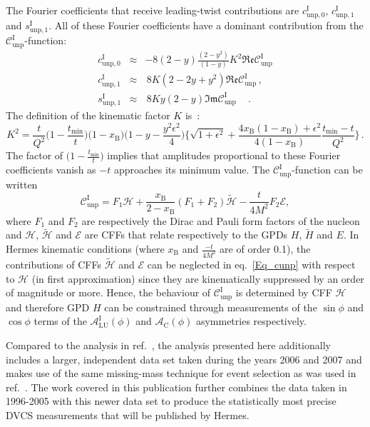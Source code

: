 The Fourier coefficients that receive leading-twist contributions are $c_{\textrm{unp},0}^{\textrm{I}}$, $c_{\textrm{unp},1}^{\textrm{I}}$ and $s_{\textrm{unp},1}^{\textrm{I}}$. All of these Fourier coefficients have a dominant contribution from the $\mathcal{C}_{\textrm{unp}}^{\textrm{I}}$-function:
\begin{eqnarray}
c_{\textrm{unp},0}^{\textrm{I}} &\approx&-8(2-y)\frac{(2-y^2)}{(1-y)}K^2\mathfrak{Re}\mathcal{C}_{\textrm{unp}}^{\textrm{I}}\label{eq:c0}
\\
c_{\textrm{unp},1}^{\textrm{I}} &\approx&\,8K(2- 2y + y^{2})\mathfrak{Re}\mathcal{C}_{\textrm{unp}}^{\textrm{I}}\,,\label{eq:c1}
\\
s_{\textrm{unp},1}^{\textrm{I}} &\approx&\,8Ky(2-y)\mathfrak{Im}\mathcal{C}_{\textrm{unp}}^{\textrm{I}}\quad\,. \label{eq:s1}
\end{eqnarray}
The definition of the kinematic factor $K$ is~\cite{Bel02b}:
\begin{equation}
K^2=\frac{t}{Q^2}\Big(1-\frac{t_{\textrm{min}}}{t}\Big)\Big(1-x_{\textrm{B}}\Big)\Big(1-y-\frac{y^2\epsilon^2}{4}\Big)\Big\lbrace\sqrt{1+\epsilon^2}+\frac{4x_{\textrm{B}}(1-x_{\textrm{B}})+\epsilon^2}{4(1-x_{\textrm{B}})}
\frac{t_{\textrm{min}}-t}{Q^2}\Big\rbrace\,.\label{eq:K}
\end{equation} 
The factor of $\Big(1-\frac{t_{\textrm{min}}}{t}\Big)$ implies that amplitudes proportional to these Fourier coefficients vanish as $-t$ approaches its minimum value.
The $\mathcal{C}_{\textrm{unp}}^{\textrm{I}}$-function can be
written
\cite{Bel02b} 
\begin{equation}
 \mathcal{C}_{\textrm{unp}}^{\textrm{I}} = F_{1}\mathcal{H} + \frac{x_{\textrm{B}}}{2-x_{\textrm{B}}}(F_{1}+F_{2})\widetilde{\mathcal{H}} -\frac{t}{4M^{2}}F_{2}\mathcal{E},
\label{Eq_cunp}
\end{equation}
where $F_{1}$ and $F_{2}$ are respectively the Dirac and Pauli form
factors of the nucleon and $\mathcal{H}$, $\widetilde{\mathcal{H}}$ and
$\mathcal{E}$ are CFFs that relate respectively to the GPDs $H$,
$\widetilde{H}$ and $E$.  In H{\sc ermes} kinematic
conditions (where $x_{\textrm{B}}$ and $\frac{-t}{4M^2}$ are of order 0.1), the
contributions of CFFs $\widetilde{\mathcal{H}}$ and $\mathcal{E}$ can be
neglected in eq.~\ref{Eq_cunp} with respect to $\mathcal{H}$ (in first approximation) since they
are kinematically suppressed by an order of magnitude or more.
Hence, the behaviour of
$\mathcal{C}_{\textrm{unp}}^{\textrm{I}}$ is determined by CFF $\mathcal{H}$
and therefore GPD $H$ can be constrained through
measurements of the $\sin\phi$ and $\cos\phi$ terms of the $\mathcal{A}^{\textrm{I}}_{\textrm{LU}}(\phi)$ and $\mathcal{A}_{\textrm{C}}(\phi)$ asymmetries respectively.

Compared to the analysis in ref.~\cite{Air09}, the analysis presented here additionally includes a larger, independent data set taken during the years 2006 and 2007 and makes use of the same missing-mass technique for event selection as was used in ref.~\cite{Air09}. The work covered in this publication further combines the data taken in 1996-2005 with this newer data set to produce the statistically most precise DVCS measurements that will be published by H{\sc ermes}.
